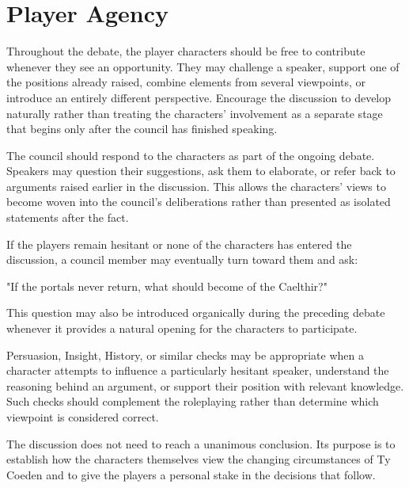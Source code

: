 \section*{Player Agency}
{\entryfont Throughout the debate, the player characters should be free to contribute whenever they see an opportunity. They may challenge a speaker, support one of the positions already raised, combine elements from several viewpoints, or introduce an entirely different perspective. Encourage the discussion to develop naturally rather than treating the characters' involvement as a separate stage that begins only after the council has finished speaking.

The council should respond to the characters as part of the ongoing debate. Speakers may question their suggestions, ask them to elaborate, or refer back to arguments raised earlier in the discussion. This allows the characters' views to become woven into the council's deliberations rather than presented as isolated statements after the fact.

If the players remain hesitant or none of the characters has entered the discussion, a council member may eventually turn toward them and ask:}
\begin{DndReadAloud}
	"If the portals never return, what should become of the Caelthir?"
\end{DndReadAloud}
{\noindent\entryfont This question may also be introduced organically during the preceding debate whenever it provides a natural opening for the characters to participate.

Persuasion, Insight, History, or similar checks may be appropriate when a character attempts to influence a particularly hesitant speaker, understand the reasoning behind an argument, or support their position with relevant knowledge. Such checks should complement the roleplaying rather than determine which viewpoint is considered correct.

The discussion does not need to reach a unanimous conclusion. Its purpose is to establish how the characters themselves view the changing circumstances of Ty Coeden and to give the players a personal stake in the decisions that follow.}